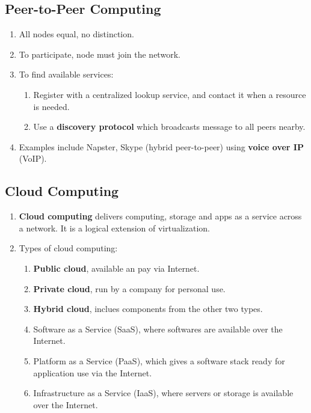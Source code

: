 \documentclass[journal,12pt,twocolumn]{IEEEtran}
\begin{document}
\subsection{Peer-to-Peer Computing}
\begin{enumerate}
    \item All nodes equal, no distinction.
    \item To participate, node must join the network.
    \item To find available services:
    \begin{enumerate}
        \item Register with a centralized lookup service, and contact it when 
        a resource is needed.
        \item Use a \textbf{discovery protocol} which broadcasts message to all 
        peers nearby.
    \end{enumerate}
    \item Examples include Napster, Skype (hybrid peer-to-peer) using 
    \textbf{voice over IP} (VoIP).
\end{enumerate}

\subsection{Cloud Computing}
\begin{enumerate}
    \item \textbf{Cloud computing} delivers computing, storage and apps as a 
    service across a network. It is a logical extension of virtualization.
    \item Types of cloud computing:
    \begin{enumerate}
        \item \textbf{Public cloud}, available an pay via Internet.
        \item \textbf{Private cloud}, run by a company for personal use.
        \item \textbf{Hybrid cloud}, inclues components from the other two 
        types.
        \item Software as a Service (SaaS), where softwares are available over 
        the Internet.
        \item Platform as a Service (PaaS), which gives a software stack ready 
        for application use via the Internet.
        \item Infrastructure as a Service (IaaS), where servers or storage is
        available over the Internet.
    \end{enumerate}
\end{enumerate}
\end{document}

